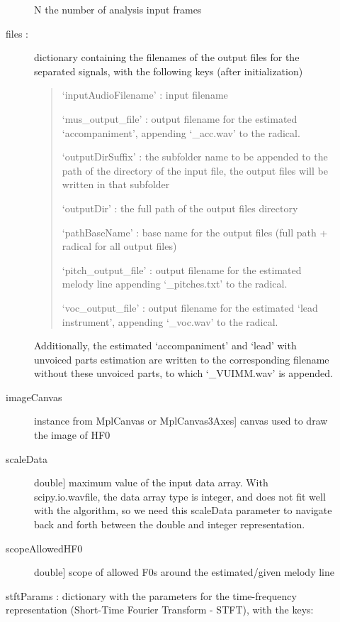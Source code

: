 \documentclass[letterpaper,10pt,english]{sphinxmanual}
\begin{document}
\begin{fulllineitems}
\begin{description}
\begin{description}
\begin{description}
\end{description}

N the number of analysis input frames

\item[{files :}] \leavevmode
dictionary containing the filenames of the output files for the
separated signals, with the following keys (after initialization)
\begin{quote}

`inputAudioFilename' : input filename

`mus\_output\_file' : output filename for the estimated
`accompaniment', appending `\_acc.wav' to the radical.

`outputDirSuffix' : the subfolder name to be appended to the path
of the directory of the input file, the output files will be
written in that subfolder

`outputDir' : the full path of the output files directory

`pathBaseName' : base name for the output files
(full path + radical for all output files)

`pitch\_output\_file' : output filename for the estimated melody line
appending `\_pitches.txt' to the radical.

`voc\_output\_file' : output filename for the estimated `lead
instrument', appending `\_voc.wav' to the radical.
\end{quote}

Additionally, the estimated `accompaniment' and `lead' with unvoiced
parts estimation are written to the corresponding filename without
these unvoiced parts, to which `\_VUIMM.wav' is appended.

\item[{imageCanvas}] \leavevmode{[}instance from MplCanvas or MplCanvas3Axes{]}
canvas used to draw the image of HF0

\item[{scaleData}] \leavevmode{[}double{]}
maximum value of the input data array.
With scipy.io.wavfile, the data array type is integer, and does not
fit well with the algorithm, so we need this scaleData parameter to
navigate back and forth between the double and integer representation.

\item[{scopeAllowedHF0}] \leavevmode{[}double{]}
scope of allowed F0s around the estimated/given melody line

\end{description}

stftParams : dictionary with the parameters for the time-frequency
representation (Short-Time Fourier Transform - STFT), with the keys:
\begin{quote}


\end{quote}
\end{description}
\end{fulllineitems}
\end{document}
